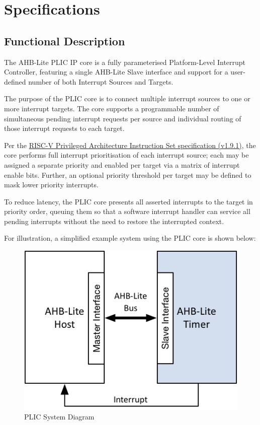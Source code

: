 \chapter{Specifications}

\section{Functional Description}

The AHB-Lite PLIC IP core is a fully parameterised Platform-Level Interrupt
Controller, featuring a single AHB-Lite Slave interface and support for a user-defined number of both Interrupt Sources and Targets.

The purpose of the PLIC core is to connect multiple interrupt sources to
one or more interrupt targets. The core supports a programmable number
of simultaneous pending interrupt requests per source and individual routing of those interrupt requests to each target.

Per the \href{https://github.com/riscv/riscv-isa-manual/blob/master/release/riscv-privileged-v1.9.1.pdf}{RISC-V Privileged Architecture Instruction Set specification (v1.9.1)}, the core performs full interrupt prioritisation of each interrupt source; each may be assigned a separate priority and enabled per target via a matrix of interrupt enable bits. Further, an optional priority threshold per target may be defined to mask lower priority interrupts.

To reduce latency, the PLIC core presents all asserted interrupts to the target in priority order, queuing them so that a software interrupt handler can service all pending interrupts without the need to restore the interrupted context.

For illustration, a simplified example system using the PLIC core is shown below:

\begin{figure}[!htb]
	\includegraphics{assets/img/plic-system}
	\caption{PLIC System Diagram}
	\label{fig:SYSDIAG}
\end{figure}

